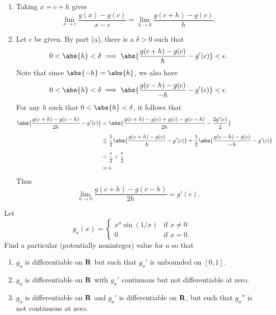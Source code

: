 \documentclass{lew98_solutions}
\begin{document}
\begin{solution}
    \begin{enumerate}
        \item Taking \( x = c + h \) gives
        \[
            \lim_{x \to c} \frac{g(x) - g(c)}{x - c} = \lim_{h \to 0} \frac{g(c + h) - g(c)}{h}.
        \]

        \item Let \( \epsilon \) be given. By part (a), there is a \( \delta > 0 \) such that
        \[
            0 < \abs{h} < \delta \implies \abs{\frac{g(c + h) - g(c)}{h} - g'(c)}< \epsilon.
        \]
        Note that since \( \abs{-h} = \abs{h} \), we also have
        \[
            0 < \abs{h} < \delta \implies \abs{\frac{g(c - h) - g(c)}{-h} - g'(c)}< \epsilon.
        \]
        For any \( h \) such that \( 0 < \abs{h} < \delta \), it follows that
        \begin{align*}
            \abs{\frac{g(c + h) - g(c - h)}{2h} - g'(c)} &= \abs{\frac{g(c + h) - g(c) + g(c) - g(c - h)}{2h} - \frac{2 g'(c)}{2}} \\[2mm]
            &\leq \frac{1}{2} \abs{\frac{g(c + h) - g(c)}{h} - g'(c)} + \frac{1}{2} \abs{\frac{g(c - h) - g(c)}{-h} - g'(c)} \\[2mm]
            &< \frac{\epsilon}{2} + \frac{\epsilon}{2} \\
            &= \epsilon.
        \end{align*}
        Thus
        \[
            \lim_{h \to 0} \frac{g(c + h) - g(c - h)}{2h} = g'(c).
        \]
    \end{enumerate}
\end{solution}

\begin{exercise}
\label{ex:5.2.7}
    Let
    \[
        g_a(x) = \begin{cases}
            x^a \sin(1/x) & \text{if } x \neq 0 \\
            0 & \text{if } x = 0.
        \end{cases}
    \]
    Find a particular (potentially noninteger) value for \( a \) so that
    \begin{enumerate}
        \item \( g_a \) is differentiable on \( \mathbf{R} \) but such that \( g_a' \) is unbounded on \( [0, 1] \).

        \item \( g_a \) is differentiable on \( \mathbf{R} \) with \( g_a' \) continuous but not differentiable at zero.

        \item \( g_a \) is differentiable on \( \mathbf{R} \) and \( g_a' \) is differentiable on \( \mathbf{R} \), but such that \( g_a'' \) is not continuous at zero.
    \end{enumerate}
\end{exercise}
\end{document}
